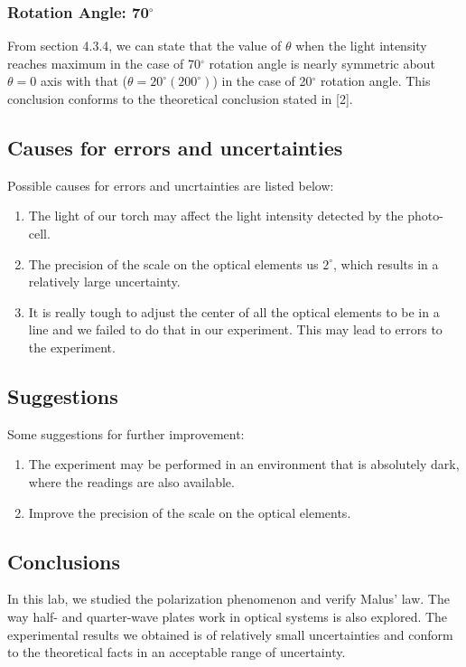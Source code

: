 \documentclass{article}
\begin{document}
\subsubsection{Rotation Angle: 70$^\circ$}

From section 4.3.4, we can state that the value of $\theta$ when the light intensity reaches maximum in the case of 70$^\circ$ rotation angle is nearly symmetric about $\theta = 0$ axis with that ($\theta = 20^\circ (200^\circ)$) in the case of 20$^\circ$ rotation angle. This conclusion conforms to the theoretical conclusion stated in [2].

\subsection{Causes for errors and uncertainties}

Possible causes for errors and uncrtainties are listed below:

\begin{enumerate}
    \item The light of our torch may affect the light intensity detected by the photo-cell.
    \item The precision of the scale on the optical elements us $2^\circ$, which results in a relatively large uncertainty.
    \item It is really tough to adjust the center of all the optical elements to be in a line and we failed to do that in our experiment. This may lead to errors to the experiment.
\end{enumerate}

\subsection{Suggestions}

Some suggestions for further improvement:

\begin{enumerate}
    \item The experiment may be performed in an environment that is absolutely dark, where the readings are also available. 
    \item Improve the precision of the scale on the optical elements. 
\end{enumerate}

\subsection{Conclusions}
In this lab, we studied the polarization phenomenon and verify Malus' law. The way half- and quarter-wave plates work in optical systems is also explored. The experimental results we obtained is of relatively small uncertainties and conform to the theoretical facts in an acceptable range of uncertainty.
\end{document}
